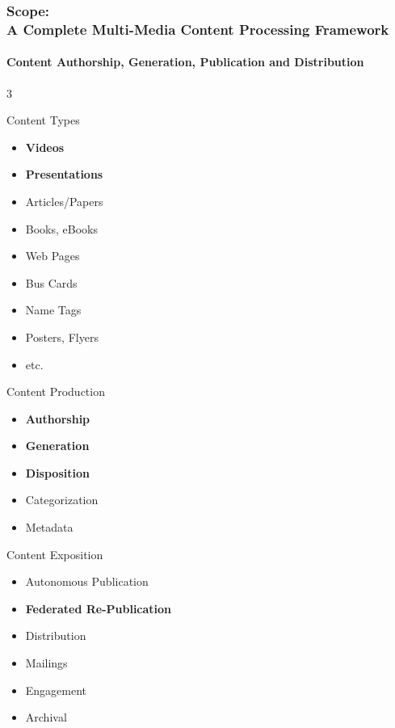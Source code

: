 \begin{whenOrg}
\begin{verblatex}

\begin{frame}[fragile,plain,label=ScopeOfBleeLcnt]
    \frametitle{Scope:\\ A Complete Multi-Media Content Processing Framework}
    \framesubtitle{Content Authorship, Generation, Publication and Distribution}

    \begin{multicols}{3}

    Content Types

      \begin{itemize}
        \item \color{violet} \textbf{Videos}
        \item \color{violet} \textbf{Presentations}
        \item \color{black} Articles/Papers
        \item Books, eBooks
        \item Web Pages
        \item Bus Cards
        \item Name Tags
        \item Posters, Flyers
        \item etc.
      \end{itemize}

      \columnbreak

      Content Production

      \begin{itemize}
      \item \color{violet} \textbf{Authorship}
      \item \color{violet} \textbf{Generation}
      \item \color{violet} \textbf{Disposition}
      \item \color{black} Categorization
      \item Metadata
      \end{itemize}

      \columnbreak

      Content Exposition

      \begin{itemize}
      \item Autonomous Publication
      \item \color{violet} \textbf{Federated Re-Publication}
      \item \color{black} Distribution
      \item Mailings
      \item Engagement
      \item Archival
      \end{itemize}



\end{multicols}
\end{frame}
\end{verblatex}
\end{whenOrg}
